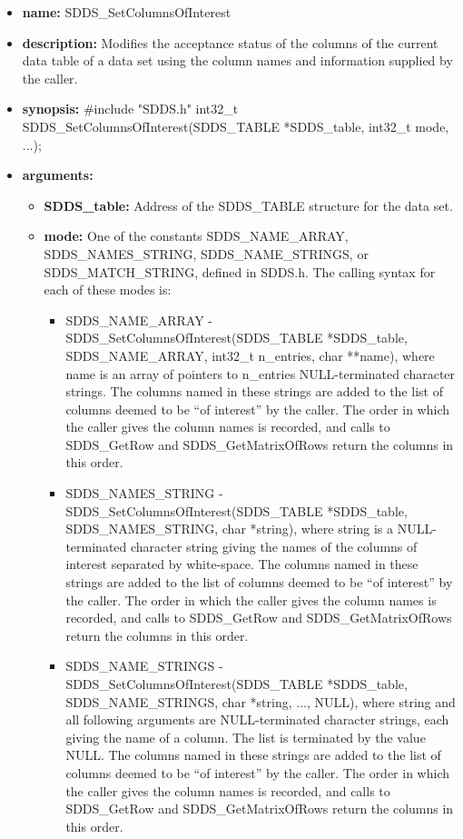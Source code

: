 \documentclass[11pt]{article}
\begin{document}
\begin{itemize}
\item {\bf name:}\newline
SDDS\_SetColumnsOfInterest
\item {\bf description:}\newline
Modifies the acceptance status of the columns of the current data table of a data set using the column names and information supplied by the caller.
\item {\bf synopsis:} \#include "SDDS.h"\newline
int32\_t SDDS\_SetColumnsOfInterest(SDDS\_TABLE *SDDS\_table, int32\_t mode, ...);
\item {\bf arguments:}
\begin{itemize}
\item {\bf SDDS\_table:} Address of the SDDS\_TABLE structure for the data set.
\item {\bf mode:} One of the constants SDDS\_NAME\_ARRAY, SDDS\_NAMES\_STRING, SDDS\_NAME\_STRINGS, or SDDS\_MATCH\_STRING, defined in  SDDS.h. The calling syntax for each of these modes is:
\begin{itemize}
\item SDDS\_NAME\_ARRAY - SDDS\_SetColumnsOfInterest(SDDS\_TABLE *SDDS\_table, SDDS\_NAME\_ARRAY, int32\_t n\_entries, char **name), where name is an array of pointers to n\_entries NULL-terminated character strings. The columns named in these strings are added to the list of columns deemed to be ``of interest'' by the caller. The order in which the caller gives the column names is recorded, and calls to SDDS\_GetRow and SDDS\_GetMatrixOfRows return the columns in this order. 
\item SDDS\_NAMES\_STRING - SDDS\_SetColumnsOfInterest(SDDS\_TABLE *SDDS\_table, SDDS\_NAMES\_STRING, char *string), where string is a NULL-terminated character string giving the names of the columns of interest separated by white-space. The columns named in these strings are added to the list of columns deemed to be ``of interest'' by the caller. The order in which the caller gives the column names is recorded, and calls to SDDS\_GetRow and SDDS\_GetMatrixOfRows return the columns in this order. 
\item SDDS\_NAME\_STRINGS - SDDS\_SetColumnsOfInterest(SDDS\_TABLE *SDDS\_table, SDDS\_NAME\_STRINGS, char *string, ..., NULL), where string and all following arguments are NULL-terminated character strings, each giving the name of a column. The list is terminated by the value NULL. The columns named in these strings are added to the list of columns deemed to be ``of interest'' by the caller. The order in which the caller gives the column names is recorded, and calls to SDDS\_GetRow and SDDS\_GetMatrixOfRows return the columns in this order. 

\end{itemize}
\end{itemize}
\end{itemize}
\end{document}
